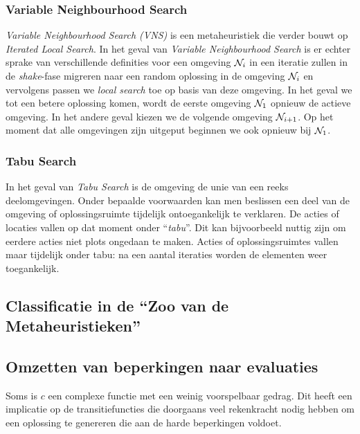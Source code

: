 \subsubsection{Variable Neighbourhood Search}

\emph{Variable Neighbourhood Search (VNS)} is een metaheuristiek die verder bouwt op \emph{Iterated Local Search}. In het geval van \emph{Variable Neighbourhood Search} is er echter sprake van verschillende definities voor een omgeving $\mathcal{N}_i$ in een iteratie zullen in de \emph{shake}-fase migreren naar een random oplossing in de omgeving $\mathcal{N}_i$ en vervolgens passen we \emph{local search} toe op basis van deze omgeving. In het geval we tot een betere oplossing komen, wordt de eerste omgeving $\mathcal{N}_1$ opnieuw de actieve omgeving. In het andere geval kiezen we de volgende omgeving $\mathcal{N}_{i+1}$. Op het moment dat alle omgevingen zijn uitgeput beginnen we ook opnieuw bij $\mathcal{N}_1$.%

\subsubsection{Tabu Search}
In het geval van \emph{Tabu Search} is de omgeving de unie van een reeks deelomgevingen. Onder bepaalde voorwaarden kan men beslissen een deel van de omgeving of oplossingsruimte tijdelijk ontoegankelijk te verklaren. De acties of locaties vallen op dat moment onder ``\emph{tabu}''. Dit kan bijvoorbeeld nuttig zijn om eerdere acties niet plots ongedaan te maken. Acties of oplossingsruimtes vallen maar tijdelijk onder tabu: na een aantal iteraties worden de elementen weer toegankelijk.

\subsection{Classificatie in de ``Zoo van de Metaheuristieken''}

\subsection{Omzetten van beperkingen naar evaluaties}

Soms is $c$ een complexe functie met een weinig voorspelbaar gedrag. Dit heeft een implicatie op de transitiefuncties die doorgaans veel rekenkracht nodig hebben om een oplossing te genereren die aan de harde beperkingen voldoet.

